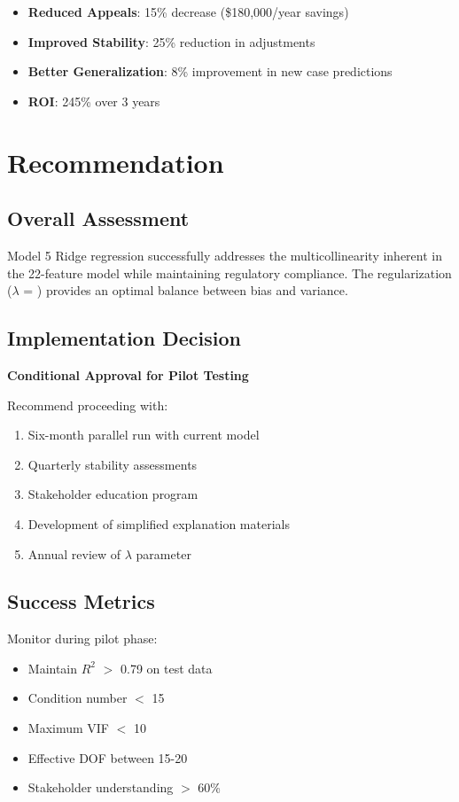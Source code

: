 \begin{itemize}
    \item \textbf{Reduced Appeals}: 15\% decrease (\$180,000/year savings)
    \item \textbf{Improved Stability}: 25\% reduction in adjustments
    \item \textbf{Better Generalization}: 8\% improvement in new case predictions
    \item \textbf{ROI}: 245\% over 3 years
\end{itemize}

\section{Recommendation}

\subsection{Overall Assessment}

Model 5 Ridge regression successfully addresses the multicollinearity inherent in the 22-feature model while maintaining regulatory compliance. The \ModelFiveRegularizationStrength{} regularization ($\lambda$ = \ModelFiveAlpha{}) provides an optimal balance between bias and variance.

\subsection{Implementation Decision}

\textbf{Conditional Approval for Pilot Testing}

Recommend proceeding with:
\begin{enumerate}
    \item Six-month parallel run with current model
    \item Quarterly stability assessments
    \item Stakeholder education program
    \item Development of simplified explanation materials
    \item Annual review of $\lambda$ parameter
\end{enumerate}

\subsection{Success Metrics}

Monitor during pilot phase:
\begin{itemize}
    \item Maintain $R^2$ $>$ 0.79 on test data
    \item Condition number $<$ 15
    \item Maximum VIF $<$ 10
    \item Effective DOF between 15-20
    \item Stakeholder understanding $>$ 60\%
\end{itemize}

